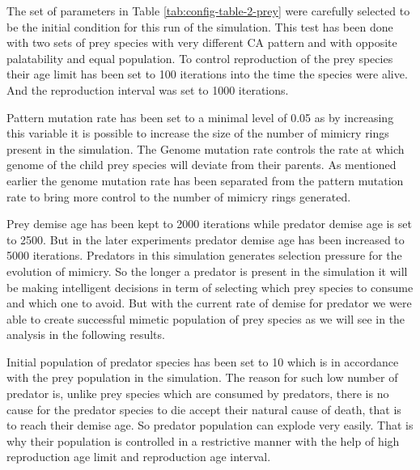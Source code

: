 The set of parameters in Table \ref{tab:config-table-2-prey} were carefully selected to be the initial condition for this run of the simulation. This test has been done with two sets of prey species with very different CA pattern and with opposite palatability and equal population. To control reproduction of the prey species their age limit has been set to 100 iterations into the time the species were alive. And the reproduction interval was set to 1000 iterations.

Pattern mutation rate has been set to a minimal level of 0.05 as by increasing this variable it is possible to increase the size of the number of mimicry rings present in the simulation. The Genome mutation rate controls the rate at which genome of the child prey species will deviate from their parents. As mentioned earlier the genome mutation rate has been separated from the pattern mutation rate to bring more control to the number of mimicry rings generated.

Prey demise age has been kept to 2000 iterations while predator demise age is set to 2500. But in the later experiments predator demise age has been increased to 5000 iterations. Predators in this simulation generates selection pressure for the evolution of mimicry. So the longer a predator is present in the simulation it will be making intelligent decisions in term of selecting which prey species to consume and which one to avoid. But with the current rate of demise for predator we were able to create successful mimetic population of prey species as we will see in the analysis in the following results.

Initial population of predator species has been set to 10 which is in accordance with the prey population in the simulation. The reason for such low number of predator is, unlike prey species which are consumed by predators, there is no cause for the predator species to die accept their natural cause of death, that is to reach their demise age. So predator population can explode very easily. That is why their population is controlled in a restrictive manner with the help of high reproduction age limit and reproduction age interval.

